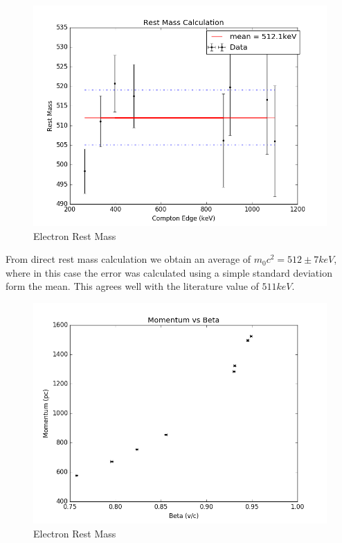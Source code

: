 \documentclass{article}
\begin{document}
\begin{figure}[!htb]
	\centering
	\includegraphics[scale=0.75]{plots/restmass_T.png}
  	\caption{Electron Rest Mass} 
 	\label{calibration}
\end{figure}

From direct rest mass calculation we obtain an average of $m_0 c^2 = 512 \pm 7 keV$, where in this case the error was calculated using a simple standard deviation form the mean. This agrees well with the literature value of $511 keV$.

\begin{figure}[!htb]
	\centering
	\includegraphics[scale=0.75]{plots/momentum_beta.png}
  	\caption{Electron Rest Mass} 
 	\label{calibration}
\end{figure}
\end{document}
